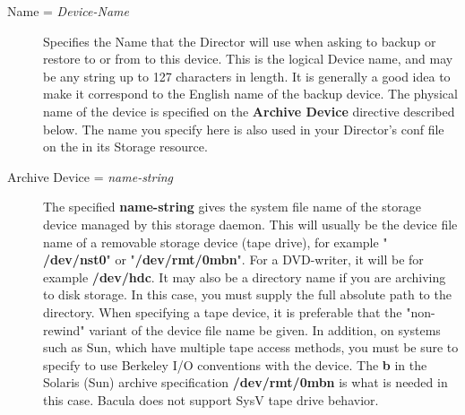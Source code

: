 \begin{description}

\item [Name = {\it Device-Name}]
   Specifies the Name that the Director will use when asking to backup or
   restore to or from to this device. This is the logical  Device name, and may
   be any string up to 127 characters in length.  It is generally a good idea to
   make it correspond to the English  name of the backup device. The physical
   name of the device is  specified on the {\bf Archive Device} directive
   described below.  The name you specify here is also used in your Director's
   conf  file on the 
     in its Storage
   resource. 

\item [Archive Device = {\it name-string}]
   The specified {\bf name-string} gives the system file name of the  storage
   device managed by this storage daemon. This will usually be  the device file
   name of a removable storage device (tape drive),  for example "{\bf
   /dev/nst0}" or "{\bf /dev/rmt/0mbn}".  For a DVD-writer, it will be for
   example {\bf /dev/hdc}.  It may also be a directory name if you are archiving
   to disk storage.  In this case, you must supply the full absolute path to the
   directory.  When specifying a tape device, it is preferable that the 
   "non-rewind" variant of the device file name be given.  In addition, on
   systems such as Sun, which have multiple tape  access methods, you must be
   sure to specify to use  Berkeley I/O conventions with the device. The {\bf b}
   in the Solaris (Sun)  archive specification {\bf /dev/rmt/0mbn} is what is
   needed in  this case. Bacula does not support SysV tape drive behavior.  
   

\end{description}
